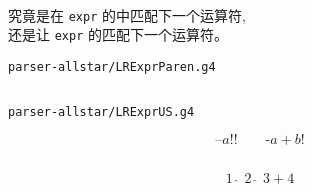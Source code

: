 \begin{frame}{}
  \begin{center}
     \\[10pt]
    究竟是在 \texttt{expr} 的中匹配下一个运算符, \\[15pt]
    还是让 \texttt{expr} 的匹配下一个运算符。
  \end{center}
\end{frame}

\begin{frame}{}
  \begin{center}
    \texttt{parser-allstar/LRExprParen.g4}
  \end{center}

  \vspace{0.30cm}
  \begin{columns}
      \pause
  \end{columns}
\end{frame}

\begin{frame}{}
  \begin{center}
    \texttt{parser-allstar/LRExprUS.g4}

    \vspace{0.30cm}
  \end{center}
\end{frame}

\begin{frame}{}
  \begin{center}
  \end{center}

  \[
    \text{--}a!! \qquad \text{-}a+b!
  \]
\end{frame}

\begin{frame}{}
  \begin{columns}
      \pause
  \end{columns}

  \vspace{0.80cm}
  \[
    1 \;\hat{\;}\; 2 \;\hat{\;}\; 3 + 4
  \]
\end{frame}

